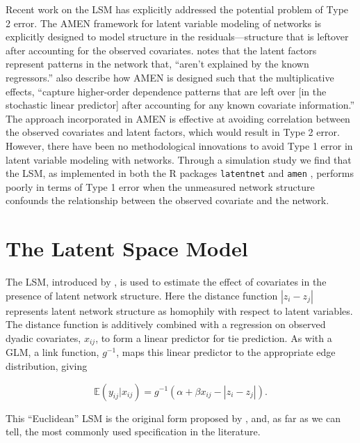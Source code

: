 \documentclass[11pt]{article}
\begin{document}
Recent work on the LSM has explicitly addressed the potential problem
of Type 2 error. The AMEN framework for latent variable modeling of
networks is explicitly designed to model structure in the
residuals---structure that is leftover after accounting for the
observed covariates. \citet[p. 43]{hoff2015dyadic} notes that the
latent factors represent patterns in the network that, ``aren't
explained by the known regressors.''
\citet[pp. 12--13]{minhas2016inferential} also describe how AMEN is
designed such that the multiplicative effects, ``capture higher-order
dependence patterns that are left over [in the stochastic linear
  predictor] after accounting for any known covariate information.''
The approach incorporated in AMEN is effective at avoiding correlation
between the observed covariates and latent factors, which would result
in Type 2 error. However, there have been no methodological
innovations to avoid Type 1 error in latent variable modeling with
networks. Through a simulation study we find that the LSM, as
implemented in both the R \citep{R} packages \texttt{latentnet}
\citep{latentnet} and \texttt{amen} \citep{amen}, performs poorly in
terms of Type 1 error when the unmeasured network structure confounds
the relationship between the observed covariate and the network.


\section{The Latent Space Model}

The LSM, introduced by \citet{hoff2002latent}, is used to estimate the
effect of covariates in the presence of latent network structure. Here
the distance function $|z_i - z_j|$ represents latent network
structure as homophily with respect to latent variables.  The distance
function is additively combined with a regression on observed dyadic
covariates, $x_{ij}$, to form a linear predictor for tie prediction.
As with a GLM, a link function, $g^{-1}$, maps this linear predictor
to the appropriate edge distribution, giving

$$\mathbb{E}(y_{ij} | x_{ij}) = g^{-1}(\alpha + \beta x_{ij} - |z_i - z_j|).$$

This ``Euclidean'' LSM is the original form proposed by
\citet{hoff2002latent}, and, as far as we can tell, the most commonly
used specification in the literature.
\end{document}
